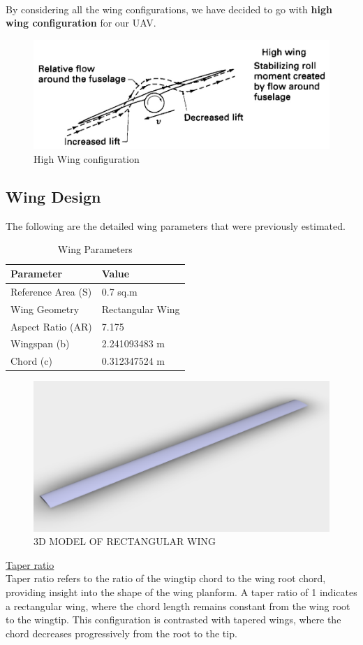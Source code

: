 \documentclass[12 pt]{article}
\begin{document}
\\By considering all the wing configurations, we have decided to go with\textbf{ high wing configuration} for our UAV.
\begin{figure}[H]
    \centering
    \includegraphics[width=\linewidth]{Codes/Week 6/wing configuration.jpeg}
    \caption{High Wing configuration}
    \label{fig:enter-label}
\end{figure}
\color{red}
\subsection{Wing Design}
\color{black}
The following are the detailed wing parameters that were previously estimated.
\begin{table}[H]
\centering
\begin{tabular}{l l}
\textbf{Parameter} & \textbf{Value} \\
\hline
Reference Area (S) & 0.7 sq.m \\
Wing Geometry & Rectangular Wing \\
Aspect Ratio (AR) & 7.175 \\
Wingspan (b) & 2.241093483 m \\
Chord (c) & 0.312347524 m \\
\end{tabular}
\caption{Wing Parameters}
\label{tab:wing_parameters}
\end{table}
\begin{figure}[H]
    \centering
    \includegraphics[width=0.8\linewidth]{3d_wing.png}
    \caption{3D MODEL OF RECTANGULAR WING}
    \label{fig:enter-label}
    \end{figure}
\color{red}
 \large{\underline{Taper ratio}}
\color{black}
\vspace{5mm}
\\Taper ratio refers to the ratio of the wingtip chord to the wing root chord, providing insight into the shape of the wing planform. A taper ratio of 1 indicates a rectangular wing, where the chord length remains constant from the wing root to the wingtip. This configuration is contrasted with tapered wings, where the chord decreases progressively from the root to the tip.
\end{document}

